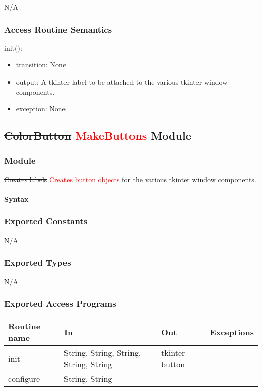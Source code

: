 \documentclass[12pt]{article}
\begin{document}
N/A

\subsubsection* {Access Routine Semantics}

\noindent init():
\begin{itemize}
\item transition: None
\item output: A tkinter label to be attached to the various tkinter window components.
\item exception: None
\end{itemize}

\subsection*{\sout{ColorButton} \textcolor{red}{MakeButtons} Module}

\subsubsection*{Module}

\sout{Creates labels} \textcolor{red}{Creates button objects} for the various tkinter window components.

\paragraph*{Syntax}

\subsubsection*{Exported Constants}
N/A
\subsubsection*{Exported Types}

N/A

\subsubsection* {Exported Access Programs}

\begin{tabular}{| l | l | l | l |}
\hline
\textbf{Routine name} & \textbf{In} & \textbf{Out} & \textbf{Exceptions}\\
\hline
init & String, String, String, String, String & tkinter button & \\
\hline
configure & String, String & & \\
\hline
\end{tabular}
\end{document}
